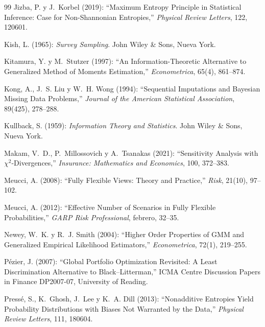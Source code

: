 \documentclass[11pt]{article}
\begin{document}
\begin{thebibliography}{99}
Jizba, P. y J.~Korbel (2019): ``Maximum Entropy Principle in Statistical
Inference: Case for Non-Shannonian Entropies,'' \textit{Physical Review
Letters}, 122, 120601.

Kish, L. (1965): \textit{Survey Sampling}. John Wiley \& Sons, Nueva York.

Kitamura, Y. y M.~Stutzer (1997): ``An Information-Theoretic Alternative to
Generalized Method of Moments Estimation,'' \textit{Econometrica}, 65(4),
861--874.

Kong, A., J.~S. Liu y W.~H. Wong (1994): ``Sequential Imputations and
Bayesian Missing Data Problems,'' \textit{Journal of the American
Statistical Association}, 89(425), 278--288.

Kullback, S. (1959): \textit{Information Theory and Statistics}. John
Wiley \& Sons, Nueva York.

Makam, V.~D., P.~Millossovich y A.~Tsanakas (2021): ``Sensitivity Analysis
with $\chi^2$-Divergences,'' \textit{Insurance: Mathematics and Economics},
100, 372--383.

Meucci, A. (2008): ``Fully Flexible Views: Theory and Practice,''
\textit{Risk}, 21(10), 97--102.

Meucci, A. (2012): ``Effective Number of Scenarios in Fully Flexible
Probabilities,'' \textit{GARP Risk Professional}, febrero, 32--35.

Newey, W.~K. y R.~J. Smith (2004): ``Higher Order Properties of GMM and
Generalized Empirical Likelihood Estimators,'' \textit{Econometrica},
72(1), 219--255.

P\'ezier, J. (2007): ``Global Portfolio Optimization Revisited: A Least
Discrimination Alternative to Black--Litterman,'' ICMA Centre Discussion
Papers in Finance DP2007-07, University of Reading.

Press\'e, S., K.~Ghosh, J.~Lee y K.~A. Dill (2013): ``Nonadditive Entropies
Yield Probability Distributions with Biases Not Warranted by the Data,''
\textit{Physical Review Letters}, 111, 180604.


\end{thebibliography}
\end{document}
